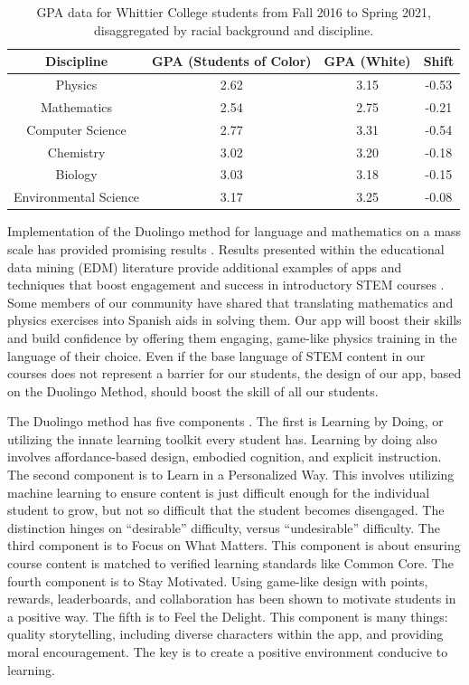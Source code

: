 \documentclass[10pt]{amsart}
\theoremstyle{definition}
\numberwithin{equation}{section}
\begin{document}
\begin{table}
\centering
\begin{tabular}{c c c c}
Discipline & GPA (Students of Color) & GPA (White) & Shift \\ \hline
Physics & 2.62 & 3.15 & -0.53 \\
Mathematics & 2.54 & 2.75 & -0.21 \\
Computer Science & 2.77 & 3.31 & -0.54 \\
Chemistry & 3.02 & 3.20 & -0.18 \\
Biology & 3.03 & 3.18 & -0.15 \\
Environmental Science & 3.17 & 3.25 & -0.08 \\
\end{tabular}
\caption{\label{tab:grades} GPA data for Whittier College students from Fall 2016 to Spring 2021, disaggregated by racial background and discipline.}
\vspace{-0.5cm}
\end{table}

Implementation of the Duolingo method for language and mathematics on a mass scale has provided promising results \cite{duolingo_whitepaper}.  Results presented within the educational data mining (EDM) literature provide additional examples of apps and techniques that boost engagement and success in introductory STEM courses \cite{edm1,edm2,edm3,edm4}.  Some members of our community have shared that translating mathematics and physics exercises into Spanish aids in solving them.  Our app will boost their skills and build confidence by offering them engaging, game-like physics training in the language of their choice.  Even if the base language of STEM content in our courses does not represent a barrier for our students, the design of our app, based on the Duolingo Method, should boost the skill of all our students. 

The Duolingo method has five components \cite{duolingo_whitepaper}.  The first is Learning by Doing, or utilizing the innate learning toolkit every student has.  Learning by doing also involves affordance-based design, embodied cognition, and explicit instruction.  The second component is to Learn in a Personalized Way.  This involves utilizing machine learning to ensure content is just difficult enough for the individual student to grow, but not so difficult that the student becomes disengaged.  The distinction hinges on ``desirable'' difficulty, versus ``undesirable'' difficulty.  The third component is to Focus on What Matters.  This component is about ensuring course content is matched to verified learning standards like Common Core.  The fourth component is to Stay Motivated.  Using game-like design with points, rewards, leaderboards, and collaboration has been shown to motivate students in a positive way.  The fifth is to Feel the Delight. This component is many things: quality storytelling, including diverse characters within the app, and providing moral encouragement.  The key is to create a positive environment conducive to learning.  
\end{document}
